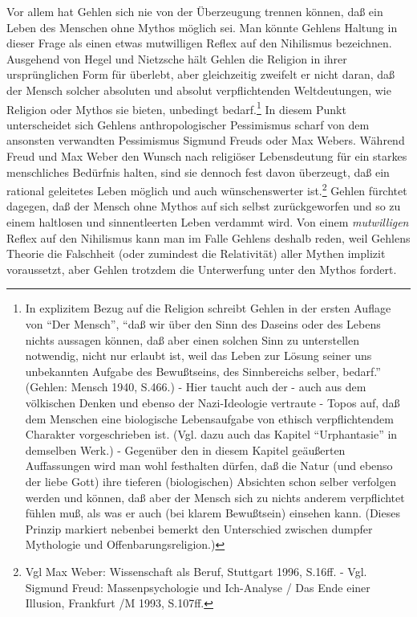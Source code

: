 \documentclass[12pt,a4paper]{article}
\begin{document}
Vor allem hat Gehlen sich nie von der Überzeugung trennen können, daß
ein Leben des Menschen ohne Mythos möglich sei. Man könnte Gehlens
Haltung in dieser Frage als einen etwas mutwilligen Reflex auf den
Nihilismus bezeichnen.  Ausgehend von Hegel und Nietzsche hält Gehlen
die Religion in ihrer ursprünglichen Form für überlebt, aber
gleichzeitig zweifelt er nicht daran, daß der Mensch solcher absoluten
und absolut verpflichtenden Weltdeutungen, wie Religion oder Mythos sie
bieten, unbedingt bedarf.\footnote{In explizitem Bezug auf die Religion
  schreibt Gehlen in der ersten Auflage von "`Der Mensch"', "`daß wir
  über den Sinn des Daseins oder des Lebens nichts aussagen können, daß
  aber einen solchen Sinn zu unterstellen notwendig, nicht nur erlaubt
  ist, weil das Leben zur Lösung seiner uns unbekannten Aufgabe des
  Bewußtseins, des Sinnbereichs selber, bedarf."' (Gehlen: Mensch 1940,
  S.466.) - Hier taucht auch der - auch aus dem völkischen Denken und
  ebenso der Nazi-Ideologie vertraute - Topos auf, daß dem Menschen eine
  biologische Lebensaufgabe von ethisch verpflichtendem Charakter
  vorgeschrieben ist. (Vgl. dazu auch das Kapitel "`Urphantasie"' in
  demselben Werk.) - Gegenüber den in diesem Kapitel geäußerten
  Auffassungen wird man wohl festhalten dürfen, daß die Natur (und
  ebenso der liebe Gott) ihre tieferen (biologischen) Absichten schon
  selber verfolgen werden und können, daß aber der Mensch sich zu nichts
  anderem verpflichtet fühlen muß, als was er auch (bei klarem
  Bewußtsein) einsehen kann. (Dieses Prinzip markiert nebenbei bemerkt
  den Unterschied zwischen dumpfer Mythologie und
  Offenbarungsreligion.)} In diesem Punkt unterscheidet sich Gehlens
anthropologischer Pessimismus scharf von dem ansonsten verwandten
Pessimismus Sigmund Freuds oder Max Webers. Während Freud und Max Weber
den Wunsch nach religiöser Lebensdeutung für ein starkes menschliches
Bedürfnis halten, sind sie dennoch fest davon überzeugt, daß ein
rational geleitetes Leben möglich und auch wünschenswerter
ist.\footnote{Vgl Max Weber: Wissenschaft als Beruf, Stuttgart 1996,
  S.16ff. - Vgl. Sigmund Freud: Massenpsychologie und Ich-Analyse / Das
  Ende einer Illusion, Frankfurt /M 1993, S.107ff.}  Gehlen fürchtet
dagegen, daß der Mensch ohne Mythos auf sich selbst zurückgeworfen und
so zu einem haltlosen und sinnentleerten Leben verdammt wird. Von einem
{\em mutwilligen} Reflex auf den Nihilismus kann man im Falle Gehlens
deshalb reden, weil Gehlens Theorie die Falschheit (oder zumindest die
Relativität) aller Mythen implizit voraussetzt, aber Gehlen trotzdem die
Unterwerfung unter den Mythos fordert.
\end{document}
